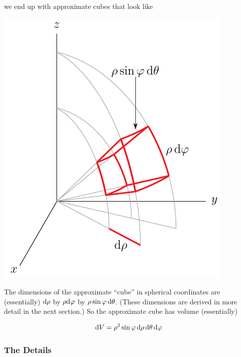 we end up with approximate cubes that look like
\begin{efig}
\begin{center}
    \includegraphics{spher5b.pdf}
\end{center}
\end{efig}
The dimensions of the approximate ``cube'' in spherical coordinates are
(essentially) $\mathrm{d}\rho$ by $\rho\mathrm{d}\varphi$ by 
$\rho\sin\varphi\,\mathrm{d}\theta$. (These dimensions are derived in more detail
in the next section.) So the approximate cube has volume (essentially)
\begin{impeqn}\label{eq dV spherical}
\begin{equation*}
\mathrm{d}V = \rho^2\sin\varphi\,\mathrm{d}\rho\,\mathrm{d}\theta\,\mathrm{d}\varphi
\end{equation*}
\end{impeqn}


\subsubsection{The Details} \label{sec spherical vol details}

